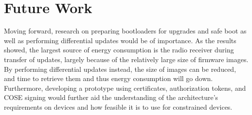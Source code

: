 \documentclass[0-thesis.tex]{subfiles}
\begin{document}
\section{Future Work}
\label{sec:future-work}
Moving forward, research on preparing bootloaders for upgrades and safe boot as well as
performing differential updates would be of importance. As the results showed, the largest
source of energy consumption is the radio receiver during transfer of updates, largely
because of the relatively large size of firmware images. By performing differential
updates instead, the size of images can be reduced, and time to retrieve them and thus
energy consumption will go down. Furthermore, developing a prototype using certificates,
authorization tokens, and COSE signing would further aid the understanding of the
architecture's requirements on devices and how feasible it is to use for constrained
devices. 
\end{document}
